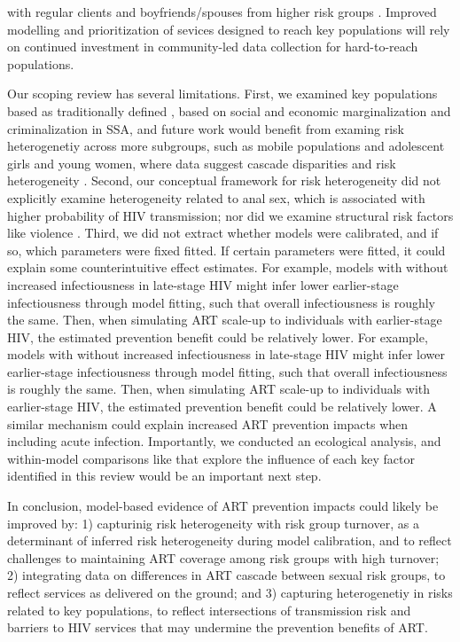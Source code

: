 with regular clients and boyfriends/spouses from higher risk groups \cite{Scorgie2012}.
Improved modelling and prioritization of sevices designed to reach key populations
will rely on continued investment in community-led data collection for hard-to-reach populations.
\par
Our scoping review has several limitations.
First, we examined key populations based as traditionally defined \cite{WHO2016kp},
based on social and economic marginalization and criminalization in SSA,
and future work would benefit from examing risk heterogenetiy across more subgroups,
such as mobile populations and adolescent girls and young women,
where data suggest cascade disparities and risk heterogeneity \cite{Tanser2015,Dellar2015}.
Second, our conceptual framework for risk heterogeneity did not explicitly examine
heterogeneity related to anal sex, which is associated with higher probability of HIV transmission;
nor did we examine structural risk factors like violence \cite{Silverman2011,Baggaley2013}.
Third, we did not extract whether models were calibrated,
and if so, which parameters were fixed \vs fitted.
If certain parameters were fitted, it could explain some counterintuitive effect estimates.
For example, models with \vs without increased infectiousness in late-stage HIV
might infer lower earlier-stage infectiousness through model fitting,
such that overall infectiousness is roughly the same.
Then, when simulating ART scale-up to individuals with earlier-stage HIV,
the estimated prevention benefit could be relatively lower.
For example, models with \vs without increased infectiousness in late-stage HIV
might infer lower earlier-stage infectiousness through model fitting,
such that overall infectiousness is roughly the same.
Then, when simulating ART scale-up to individuals with earlier-stage HIV,
the estimated prevention benefit could be relatively lower.
A similar mechanism could explain increased ART prevention impacts when including acute infection.
Importantly, we conducted an ecological analysis,
and within-model comparisons like \cite{Dodd2010,Hontelez2013} that explore
the influence of each key factor identified in this review would be an important next step.
\par
In conclusion, model-based evidence of ART prevention impacts could likely be improved by:
1) capturinig risk heterogeneity with risk group turnover,
   as a determinant of inferred risk heterogeneity during model calibration, and
   to reflect challenges to maintaining ART coverage among risk groups with high turnover;
2) integrating data on differences in ART cascade between sexual risk groups,
   to reflect services as delivered on the ground; and
3) capturing heterogenetiy in risks related to key populations,
   to reflect intersections of transmission risk and barriers to HIV services
   that may undermine the prevention benefits of ART.
